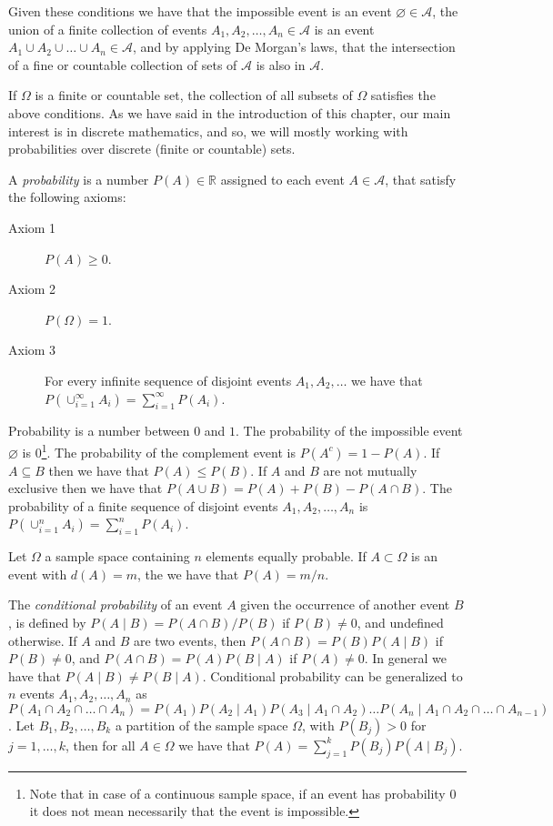 Given these conditions we have that the impossible event is an event $\varnothing \in \mathcal{A}$, the union of a finite collection of events $A_1, A_2, \ldots, A_n \in \mathcal{A}$ is an event $A_1 \cup A_2 \cup \ldots \cup A_n \in \mathcal{A}$, and by applying De Morgan's laws, that the intersection of a fine or countable collection of sets of $\mathcal{A}$ is also in $\mathcal{A}$.

If $\Omega$ is a finite or countable set, the collection of all subsets of $\Omega$ satisfies the above conditions. As we have said in the introduction of this chapter, our main interest is in discrete mathematics, and so, we will mostly working with probabilities over discrete (finite or countable) sets.

A \emph{probability} is a number $P(A) \in \mathbb{R}$ assigned to each event $A \in \mathcal{A}$, that satisfy the following axioms:

\medskip

\begin{description}
\item [Axiom 1] $P(A) \geq 0$.
\item [Axiom 2] $P(\Omega) = 1$.
\item [Axiom 3] For every infinite sequence of disjoint events $A_1, A_2, \ldots$ we have that $P(\cup_{i=1}^\infty A_i) = \sum_{i=1}^\infty P(A_i)$.
\end{description}

\medskip

Probability is a number between $0$ and $1$. The probability of the impossible event $\varnothing$ is $0$\footnote{Note that in case of a continuous sample space, if an event has probability $0$ it does not mean necessarily that the event is impossible.}. The probability of the complement event is $P(A^c) = 1 - P(A)$. If $A \subseteq B$ then we have that $P(A) \leq P(B)$. If $A$ and $B$ are not mutually exclusive then we have that $P(A \cup B) = P(A) + P(B) - P(A \cap B)$. The probability of a finite sequence of disjoint events $A_1, A_2, \ldots, A_n$ is $P(\cup_{i=1}^n A_i) = \sum_{i=1}^n P(A_i)$.

\begin{example}
Let $\Omega$ a sample space containing $n$ elements equally probable. If $A \subset \Omega$ is an event with $d(A) = m$, the we have that $P(A) = m/n$.
\end{example}

The \emph{conditional probability} of an event $A$ given the occurrence of another event $B$, is defined by $P(A \mid B) = P(A \cap B) / P(B)$ if $P(B) \neq 0$, and undefined otherwise. If $A$ and $B$ are two events, then $P(A \cap B) = P(B) P(A \mid B)$ if $P(B) \neq 0$, and $P(A \cap B) = P(A) P(B \mid A)$ if $P(A) \neq 0$. In general we have that $P(A \mid B) \neq P(B \mid A)$. Conditional probability can be generalized to $n$ events $A_1, A_2, \ldots, A_n$ as $P(A_1 \cap A_2 \cap \ldots \cap A_n) = P(A_1) P(A_2 \mid A_1) P(A_3 \mid A_1 \cap A_2) \ldots P(A_n \mid A_1 \cap A_2 \cap \ldots \cap A_{n-1})$. Let $B_1, B_2, \ldots, B_k$ a partition of the sample space $\Omega$, with $P(B_j) > 0$ for $j = 1, \ldots, k$, then for all $A \in \Omega$ we have that $P(A) = \sum_{j=1}^k P(B_j)P(A \mid B_j)$.

